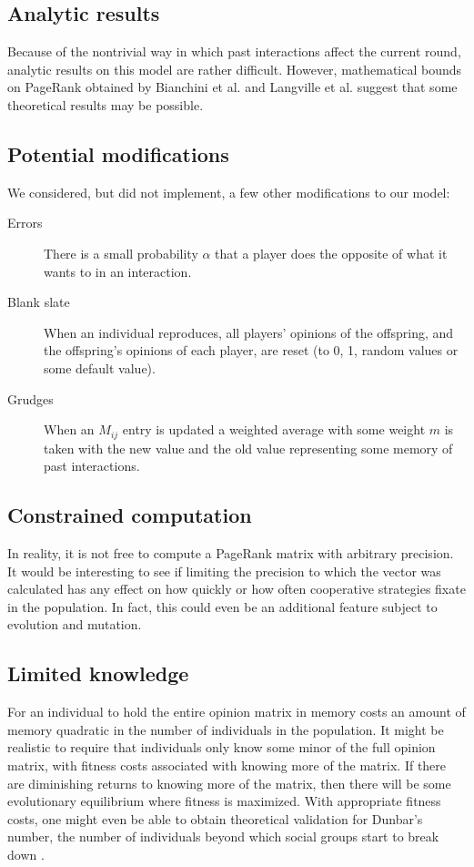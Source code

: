 \documentclass{amsart}
\begin{document}
\subsection{Analytic results}

Because of the nontrivial way in which past interactions affect the
current round, analytic results on this model are rather
difficult. However, mathematical bounds on PageRank obtained by
Bianchini et al. \cite{bianchini_Inside_2005} and Langville et
al. \cite{langville_deeper_2004} suggest that some theoretical results
may be possible.

\subsection{Potential modifications}

We considered, but did not implement, a few other modifications to our
model:
\begin{description}
\item[Errors] There is a small probability $\alpha$ that a player does
  the opposite of what it wants to in an interaction.
\item[Blank slate] When an individual reproduces, all players'
  opinions of the offspring, and the offspring's opinions of each
  player, are reset (to 0, 1, random values or some default value).
\item[Grudges] When an $M_{ij}$ entry is updated a weighted average
  with some weight $m$ is taken with the new value and the old value
  representing some memory of past interactions.
\end{description}

\subsection{Constrained computation}

In reality, it is not free to compute a PageRank matrix with arbitrary
precision. It would be interesting to see if limiting the precision to
which the vector was calculated has any effect on how quickly or how
often cooperative strategies fixate in the population. In fact, this
could even be an additional feature subject to evolution and mutation.

\subsection{Limited knowledge}

For an individual to hold the entire opinion matrix in memory costs an
amount of memory quadratic in the number of individuals in the
population. It might be realistic to require that individuals only
know some minor of the full opinion matrix, with fitness costs
associated with knowing more of the matrix. If there are diminishing
returns to knowing more of the matrix, then there will be some
evolutionary equilibrium where fitness is maximized. With appropriate
fitness costs, one might even be able to obtain theoretical validation
for Dunbar's number, the number of individuals beyond which social
groups start to break down \cite{dunbar_neocortex_1995}.

 
\end{document}
